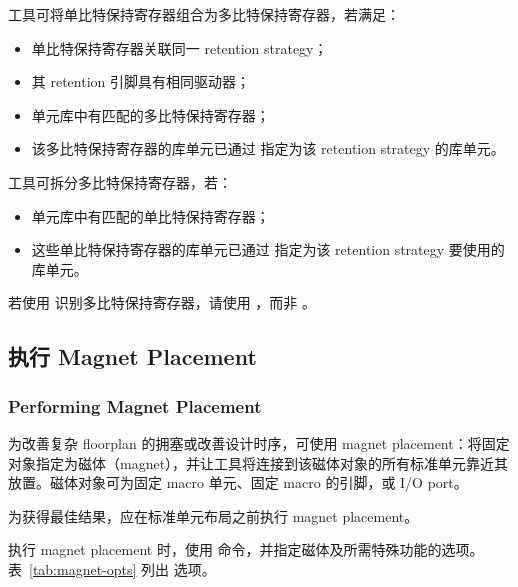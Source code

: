 工具可将单比特保持寄存器组合为多比特保持寄存器，若满足：
\begin{itemize}
  \item 单比特保持寄存器关联同一 retention strategy；
  \item 其 retention 引脚具有相同驱动器；
  \item 单元库中有匹配的多比特保持寄存器；
  \item 该多比特保持寄存器的库单元已通过  指定为该 retention strategy 的库单元。
\end{itemize}

工具可拆分多比特保持寄存器，若：
\begin{itemize}
  \item 单元库中有匹配的单比特保持寄存器；
  \item 这些单比特保持寄存器的库单元已通过  指定为该 retention strategy 要使用的库单元。
\end{itemize}

\begin{noteBox}
若使用  识别多比特保持寄存器，请使用 ，而非 。
\end{noteBox}

\subsection{执行 Magnet Placement}
\subsubsection*{Performing Magnet Placement}

为改善复杂 floorplan 的拥塞或改善设计时序，可使用 magnet placement：将固定对象指定为磁体（magnet），并让工具将连接到该磁体对象的所有标准单元靠近其放置。磁体对象可为固定 macro 单元、固定 macro 的引脚，或 I/O port。

为获得最佳结果，应在标准单元布局之前执行 magnet placement。

执行 magnet placement 时，使用  命令，并指定磁体及所需特殊功能的选项。表~\ref{tab:magnet-opts} 列出  选项。

